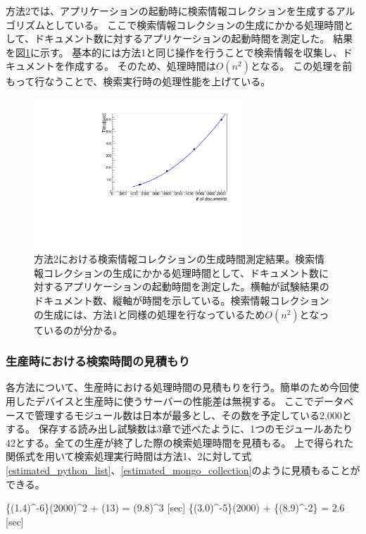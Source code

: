 方法2では、アプリケーションの起動時に検索情報コレクションを生成するアルゴリズムとしている。
ここで検索情報コレクションの生成にかかる処理時間として、ドキュメント数に対するアプリケーションの起動時間を測定した。
結果を図\ref{creating_cache_time}に示す。
基本的には方法1と同じ操作を行うことで検索情報を収集し、ドキュメントを作成する。
そのため、処理時間は$O(n^2)$となる。
この処理を前もって行なうことで、検索実行時の処理性能を上げている。
\begin{figure}[bpt]
  \begin{center}
  \includegraphics[width=8cm,angle=270]{./creating_cache_time.pdf}
  \caption[方法2における検索情報コレクションの生成時間測定結果]{方法2における検索情報コレクションの生成時間測定結果。検索情報コレクションの生成にかかる処理時間として、ドキュメント数に対するアプリケーションの起動時間を測定した。横軸が試験結果のドキュメント数、縦軸が時間を示している。検索情報コレクションの生成には、方法1と同様の処理を行なっているため$O(n^2)$となっているのが分かる。}
  \label{creating_cache_time}
  \end{center}
\end{figure}

\subsubsection{生産時における検索時間の見積もり}
各方法について、生産時における処理時間の見積もりを行う。簡単のため今回使用したデバイスと生産時に使うサーバーの性能差は無視する。
ここでデータベースで管理するモジュール数は日本が最多とし、その数を予定している2,000とする。
保存する読み出し試験数は3章で述べたように、1つのモジュールあたり42とする。全ての生産が終了した際の検索処理時間を見積もる。
上で得られた関係式を用いて検索処理実行時間は方法1、2に対して式\ref{estimated_python_list}、\ref{estimated_mongo_collection}のように見積もることができる。

\bbb
\{(1.4)^{-6}\}\times(2000)^2 + (13) = (9.8)^{3} [\rm{sec}]
\label{estimated_python_list}
\eee
\bbb
\{(3.0)^{-5}\}\times(2000) + \{(8.9)^{-2}\} = 2.6 [\rm{sec}]
\label{estimated_mongo_collection}
\eee

